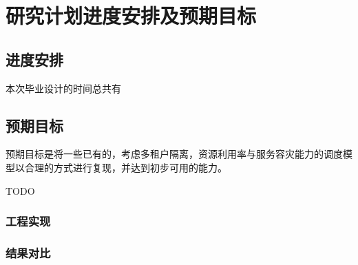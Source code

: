 \section{研究计划进度安排及预期目标}

\subsection{进度安排}

本次毕业设计的时间总共有

\subsection{预期目标}

预期目标是将一些已有的，考虑多租户隔离，资源利用率与服务容灾能力的调度模型以合理的方式进行复现，并达到初步可用的能力。

TODO

\subsubsection{工程实现}

\subsubsection{结果对比}